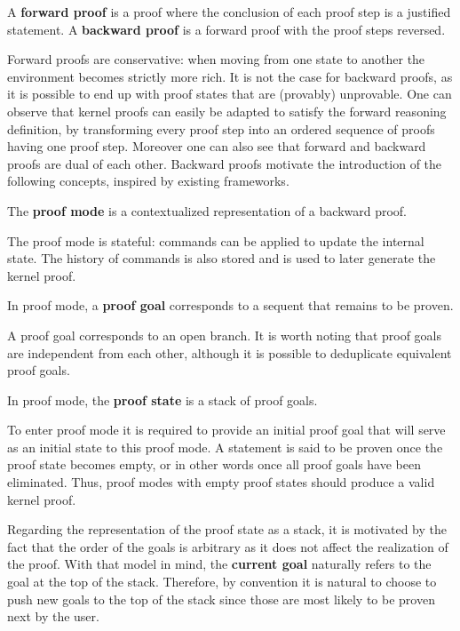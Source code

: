 \begin{definition}
A \textbf{forward proof} is a proof where the conclusion of each proof step is a justified statement.
A \textbf{backward proof} is a forward proof with the proof steps reversed.
\end{definition}

Forward proofs are conservative: when moving from one state to another the environment becomes strictly more rich. It is not the case for backward proofs, as it is possible to end up with proof states that are (provably) unprovable. One can observe that kernel proofs can easily be adapted to satisfy the forward reasoning definition, by transforming every proof step into an ordered sequence of proofs having one proof step. Moreover one can also see that forward and backward proofs are dual of each other. Backward proofs motivate the introduction of the following concepts, inspired by existing frameworks.

\begin{definition}
The \textbf{proof mode} is a contextualized representation of a backward proof.
\end{definition}

The proof mode is stateful: commands can be applied to update the internal state. The history of commands is also stored and is used to later generate the kernel proof.

\begin{definition}
In proof mode, a \textbf{proof goal} corresponds to a sequent that remains to be proven.
\end{definition}

A proof goal corresponds to an open branch. It is worth noting that proof goals are independent from each other, although it is possible to deduplicate equivalent proof goals.

\begin{definition}
In proof mode, the \textbf{proof state} is a stack of proof goals.
\end{definition}

To enter proof mode it is required to provide an initial proof goal that will serve as an initial state to this proof mode. A statement is said to be proven once the proof state becomes empty, or in other words once all proof goals have been eliminated. Thus, proof modes with empty proof states should produce a valid kernel proof.

Regarding the representation of the proof state as a stack, it is motivated by the fact that the order of the goals is arbitrary as it does not affect the realization of the proof. With that model in mind, the \textbf{current goal} naturally refers to the goal at the top of the stack. Therefore, by convention it is natural to choose to push new goals to the top of the stack since those are most likely to be proven next by the user.

